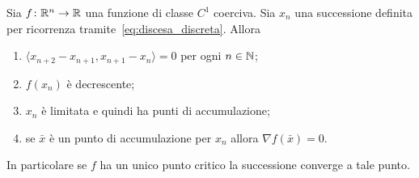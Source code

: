 \begin{theorem}
Sia $f\colon {\mathbb R}^n\to {\mathbb R}$ una funzione di classe $C^1$
coerciva. 
Sia $x_n$ una successione definita per ricorrenza 
tramite~\eqref{eq:discesa_discreta}. Allora
\begin{enumerate}
  \item $\langle x_{n+2}-x_{n+1}, x_{n+1}-x_n\rangle =0$ per ogni $n\in{\mathbb N}$;
  \item $f(x_n)$ è decrescente;
  \item $x_n$ è limitata e quindi ha punti di accumulazione;
  \item se $\bar x$ è un punto di accumulazione 
  per $x_n$ allora $\nabla f(\bar x)=0$.
\end{enumerate}

In particolare se $f$ ha un unico punto critico 
la successione converge a tale punto.
\end{theorem}
%
